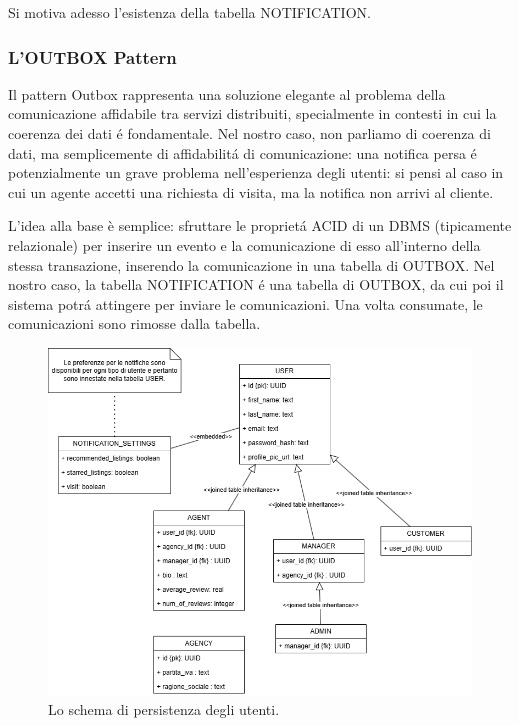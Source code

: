 Si motiva adesso l'esistenza della tabella NOTIFICATION.
\subsubsection{L'OUTBOX Pattern}
Il pattern Outbox rappresenta una soluzione elegante al problema della comunicazione affidabile 
tra servizi distribuiti, specialmente in contesti in cui la coerenza dei dati é fondamentale.
Nel nostro caso, non parliamo di coerenza di dati, ma semplicemente di affidabilitá di comunicazione:
una notifica persa é potenzialmente un grave problema nell'esperienza degli utenti: si pensi al caso 
in cui un agente accetti una richiesta di visita, ma la notifica non arrivi al cliente.

L'idea alla base è semplice: sfruttare le proprietá ACID di un DBMS (tipicamente relazionale) per 
inserire un evento e la comunicazione di esso all'interno della stessa transazione, inserendo la 
comunicazione in una tabella di OUTBOX.
Nel nostro caso, la tabella NOTIFICATION é una tabella di OUTBOX, da cui poi il sistema
potrá attingere per inviare le comunicazioni. Una volta consumate, le comunicazioni sono
rimosse dalla tabella.

\begin{figure}[H]
    \centering
    \includegraphics[width=\textwidth]{assets/diagrams/db-scheme/users.png}
    \caption{Lo schema di persistenza degli utenti.}
    \label{fig:Schema di persistenza degli utenti}
\end{figure}

